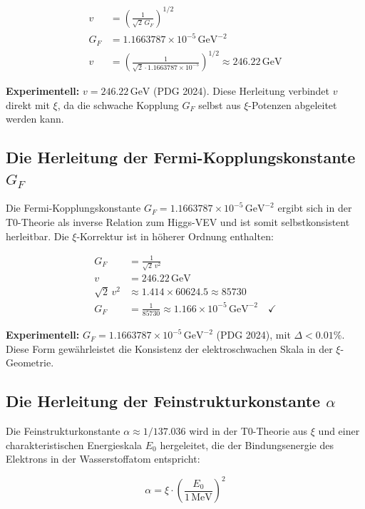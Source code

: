 	\begin{align}
		v &= \left( \frac{1}{\sqrt{2} \, G_F} \right)^{1/2} \\
		G_F &= 1.1663787 \times 10^{-5} \,\si{\giga\electronvolt\tothe{-2}} \\
		v &= \left( \frac{1}{\sqrt{2} \cdot 1.1663787 \times 10^{-5}} \right)^{1/2} \approx 246.22 \,\si{\giga\electronvolt}
	\end{align}
	
	\textbf{Experimentell:} $v = 246.22\,\si{\giga\electronvolt}$ (PDG 2024). Diese Herleitung verbindet $v$ direkt mit $\xi$, da die schwache Kopplung $G_F$ selbst aus $\xi$-Potenzen abgeleitet werden kann.
	\subsection{Die Herleitung der Fermi-Kopplungskonstante $G_F$}
	Die Fermi-Kopplungskonstante $G_F = 1.1663787 \times 10^{-5} \,\si{\giga\electronvolt\tothe{-2}}$ ergibt sich in der T0-Theorie als inverse Relation zum Higgs-VEV und ist somit selbstkonsistent herleitbar. Die $\xi$-Korrektur ist in höherer Ordnung enthalten:
	
	\begin{align}
		G_F &= \frac{1}{\sqrt{2} \, v^2} \\
		v &= 246.22 \,\si{\giga\electronvolt} \\
		\sqrt{2} \, v^2 &\approx 1.414 \times 60624.5 \approx 85730 \\
		G_F &= \frac{1}{85730} \approx 1.166 \times 10^{-5} \,\si{\giga\electronvolt\tothe{-2}} \quad \checkmark
	\end{align}
	
	\textbf{Experimentell:} $G_F = 1.1663787 \times 10^{-5} \,\si{\giga\electronvolt\tothe{-2}}$ (PDG 2024), mit $\Delta < 0.01\%$. Diese Form gewährleistet die Konsistenz der elektroschwachen Skala in der $\xi$-Geometrie.
	\subsection{Die Herleitung der Feinstrukturkonstante $\alpha$}
	Die Feinstrukturkonstante $\alpha \approx 1/137.036$ wird in der T0-Theorie aus $\xi$ und einer charakteristischen Energieskala $E_0$ hergeleitet, die der Bindungsenergie des Elektrons in der Wasserstoffatom entspricht:
	
	\begin{equation}
		\alpha = \xi \cdot \left( \frac{E_0}{1\,\si{\mega\electronvolt}} \right)^2
	\end{equation}
	
